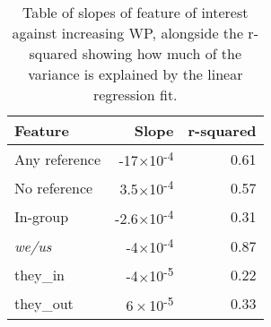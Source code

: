 \begin{table}[t]
    \centering
    \begin{tabular}{lrr}
        \toprule
        \textbf{Feature} & \textbf{Slope} & \textbf{r-squared} \\ \midrule
        Any reference & -17$\times$10\textsuperscript{-4} & 0.61 \\ 
        No reference & 3.5$\times$10\textsuperscript{-4} & 0.57 \\\midrule\pause
        In-group & -2.6$\times$10\textsuperscript{-4} & 0.31 \\ 
        \emph{we/us} & -4$\times$10\textsuperscript{-4} & 0.87 \\ 
        they\_in & -4$\times$10\textsuperscript{-5} & 0.22 \\
        they\_out & $6\times$10\textsuperscript{-5} & 0.33\\\bottomrule
    \end{tabular}
    \caption{Table of slopes of feature of interest against increasing WP, alongside the r-squared showing how much of the variance is explained by the linear regression fit.}
    \label{tab:slopes}
\end{table}
